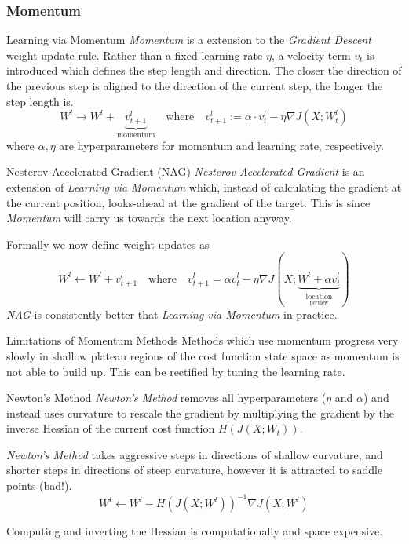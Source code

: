 \documentclass[11pt,a4paper]{article}
\begin{document}
\subsubsection{Momentum}

  \begin{definition}{Learning via Momentum}
    \textit{Momentum} is a extension to the \textit{Gradient Descent} weight update rule. Rather than a fixed learning rate $\eta$, a velocity term $v_t$ is introduced which defines the step length and direction. The closer the direction of the previous step is aligned to the direction of the current step, the longer the step length is.
    \[ W^l\rightarrow W^l+\underbrace{v^l_{t+1}}_\text{momentum}\quad\text{where}\quad v^l_{t+1}:=\alpha\cdot v^l_t-\eta\nabla J(X;W_t^l) \]
    where $\alpha,\eta$ are hyperparameters for momentum and learning rate, respectively.
  \end{definition}

  \begin{proposition}{Nesterov Accelerated Gradient (NAG)}
    \textit{Nesterov Accelerated Gradient} is an extension of \textit{Learning via Momentum} which, instead of calculating the gradient at the current position, looks-ahead at the gradient of the target. This is since \textit{Momentum} will carry us towards the next location anyway.
    \par Formally we now define weight updates as
    \[ W^l\leftarrow W^l+v^l_{t+1}\quad\text{where}\quad v^l_{t+1}=\alpha v^l_t-\eta\nabla J(X;\underbrace{W^l+\alpha v^l_t}_{ \underset{\text{perview}}{\text{location}}}) \]
    \textit{NAG} is consistently better that \textit{Learning via Momentum} in practice.
  \end{proposition}

  \begin{remark}{Limitations of Momentum Methods}
    Methods which use momentum progress very slowly in shallow plateau regions of the cost function state space as momentum is not able to build up. This can be rectified by tuning the learning rate.
  \end{remark}

  \begin{proposition}{Newton's Method}
    \textit{Newton's Method} removes all hyperparameters ($\eta$ and $\alpha$) and instead uses curvature to rescale the gradient by multiplying the gradient by the inverse Hessian of the current cost function $H(J(X;W_t))$.
    \par \textit{Newton's Method} takes aggressive steps in directions of shallow curvature, and shorter steps in directions of steep curvature, however it is attracted to saddle points (bad!).
    \[ W^l\leftarrow W^l- H(J(X;W^l))^{-1}\nabla J(X;W^l) \]
    \par Computing and inverting the Hessian is computationally and space expensive.
  \end{proposition}
\end{document}
